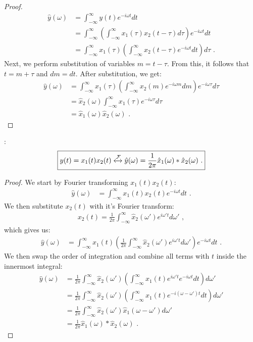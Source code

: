 \begin{proof}
\begin{align}
\hat{y}(\omega) &= \int_{-\infty}^{\infty} y(t) e^{-i\omega t} dt \\
                 &= \int_{-\infty}^{\infty} \left( \int_{-\infty}^{\infty} x_1(\tau) x_2(t-\tau) d\tau \right) e^{-i\omega t} dt \\
                 &= \int_{-\infty}^{\infty}   x_1(\tau) \left( \int_{-\infty}^{\infty} x_2(t-\tau) e^{-i\omega t} dt \right) d\tau \,\,.
\end{align}
Next, we perform substitution of variables $m=t-\tau$. From this, it follows that $t=m+\tau$ and $dm=dt$. After substitution, we get:
\begin{align}
\hat{y}(\omega)&= \int_{-\infty}^{\infty}   x_1(\tau) \left( \int_{-\infty}^{\infty} x_2(m) e^{-i\omega m} dm \right) e^{-i\omega \tau} d\tau  \\
                &= \hat{x}_2(\omega) \int_{-\infty}^{\infty}   x_1(\tau)  e^{-i\omega \tau} d\tau  \\
                &= \hat{x}_1(\omega)\hat{x}_2(\omega)\,\,.
\end{align}
\end{proof}
:
\begin{equation}
\boxed{
y(t) = x_1(t)x_2(t) \xleftrightarrow{\mathcal{F}} \hat{y}(\omega) = \frac{1}{2\pi}\hat{x}_1(\omega) * \hat{x}_2(\omega)\,\,.
}
\end{equation}
\begin{proof}
We start by Fourier transforming $x_1(t)x_2(t)$:
\begin{align}
\hat{y}(\omega) &= \int_{-\infty}^{\infty} x_1(t) x_2(t) e^{-i\omega t} dt \,\,.
\end{align}
We then substitute $x_2(t)$ with it's Fourier transform:
\begin{align}
x_2(t) = \frac{1}{2\pi}\int_{-\infty}^{\infty} \hat{x}_2(\omega') e^{i\omega' t}d\omega'\,\,,
\end{align}
which gives us:
\begin{align}
\hat{y}(\omega) &= \int_{-\infty}^{\infty} x_1(t) \left(\frac{1}{2\pi}\int_{-\infty}^{\infty} \hat{x}_2(\omega') e^{i\omega' t} d\omega' \right) e^{-i\omega t} dt\,\,.
\end{align}
We then swap the order of integration and combine all terms with $t$ inside the innermost integral:
\begin{align}
\hat{y}(\omega)   &= \frac{1}{2\pi} \int_{-\infty}^{\infty} \hat{x}_2(\omega')  \left(\int_{-\infty}^{\infty}  x_1(t) e^{i\omega' t} e^{-i\omega t} dt  \right) d\omega'  \\
    &= \frac{1}{2\pi} \int_{-\infty}^{\infty} \hat{x}_2(\omega')  \left(\int_{-\infty}^{\infty}  x_1(t) e^{-{i(\omega-\omega')t}} dt  \right) d\omega'  \\
    &= \frac{1}{2\pi} \int_{-\infty}^{\infty} \hat{x}_2(\omega')  \hat{x}_1\left(\omega-\omega'\right) d\omega'  \\
    &= \frac{1}{2\pi}\hat{x}_1(\omega )  *\hat{x}_2(\omega)\,\,.
\end{align}
\end{proof}
